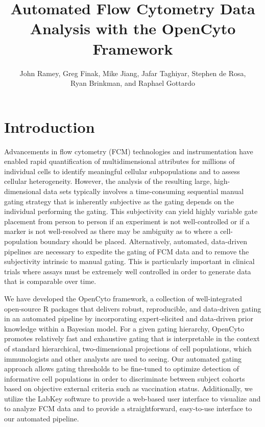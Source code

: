 \documentclass[12pt]{article}
\begin{document}
\title{Automated Flow Cytometry Data Analysis with the OpenCyto Framework}
\author{John Ramey, Greg Finak, Mike Jiang, Jafar Taghiyar, Stephen de Rosa,\\ Ryan Brinkman, and Raphael Gottardo}

\maketitle

\doublespacing

\maketitle

\doublespacing

\section{Introduction}

Advancements in flow cytometry (FCM) technologies and instrumentation have enabled rapid quantification of multidimensional attributes for millions of individual cells to identify meaningful cellular subpopulations and to assess cellular heterogeneity. However, the analysis of the resulting large, high-dimensional data sets typically involves a time-consuming sequential manual gating strategy that is inherently subjective as the gating depends on the individual performing the gating. This subjectivity can yield highly variable gate placement from person to person if an experiment is not well-controlled or if a marker is not well-resolved as there may be ambiguity as to where a cell-population boundary should be placed. Alternatively, automated, data-driven pipelines are necessary to expedite the gating of FCM data and to remove the subjectivity intrinsic to manual gating. This is particularly important in clinical trials where assays must be extremely well controlled in order to generate data that is comparable over time.

We have developed the OpenCyto framework, a collection of well-integrated open-source R packages that delivers robust, reproducible, and data-driven gating in an automated pipeline by incorporating expert-elicited and data-driven prior knowledge within a Bayesian model. For a given gating hierarchy, OpenCyto promotes relatively fast and exhaustive gating that is interpretable in the context of standard hierarchical, two-dimensional projections of cell populations, which immunologists and other analysts are used to seeing. Our automated gating approach allows gating thresholds to be fine-tuned to optimize detection of informative cell populations in order to discriminate between subject cohorts based on objective external criteria such as vaccination status. Additionally, we utilize the LabKey software to provide a web-based user interface to visualize and to analyze FCM data and to provide a straightforward, easy-to-use interface to our automated pipeline.
\end{document}
